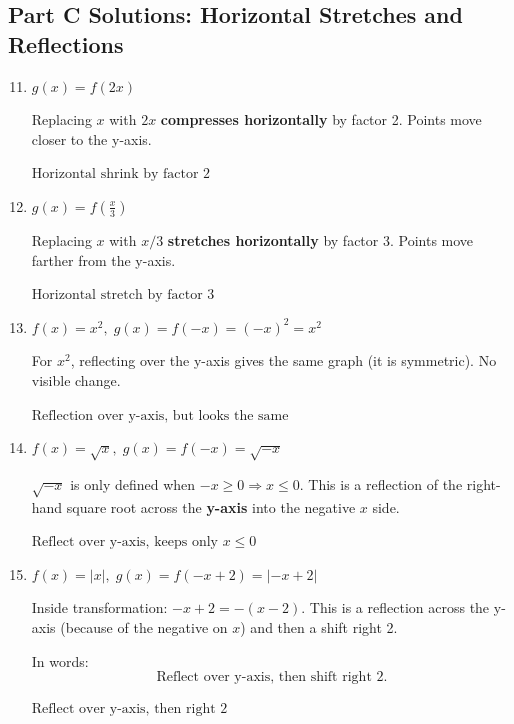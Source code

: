 \documentclass[14pt]{extarticle}
\begin{document}
\subsection*{Part C Solutions: Horizontal Stretches and Reflections}
\begin{enumerate}
  \setcounter{enumi}{10}
  \item \(g(x) = f(2x)\)

  Replacing \(x\) with \(2x\) \textbf{compresses horizontally} by factor 2. Points move closer to the y-axis.

  \(\boxed{\text{Horizontal shrink by factor 2}}\)

  \item \(g(x) = f\left(\frac{x}{3}\right)\)

  Replacing \(x\) with \(x/3\) \textbf{stretches horizontally} by factor 3. Points move farther from the y-axis.

  \(\boxed{\text{Horizontal stretch by factor 3}}\)

  \item \(f(x) = x^2,\; g(x) = f(-x) = (-x)^2 = x^2\)

  For \(x^2\), reflecting over the y-axis gives the same graph (it is symmetric). No visible change.

  \(\boxed{\text{Reflection over y-axis, but looks the same}}\)

  \item \(f(x) = \sqrt{x},\; g(x) = f(-x) = \sqrt{-x}\)

  \(\sqrt{-x}\) is only defined when \(-x \ge 0 \Rightarrow x \le 0.\)  
  This is a reflection of the right-hand square root across the \textbf{y-axis} into the negative \(x\) side.

  \(\boxed{\text{Reflect over y-axis, keeps only } x \le 0}\)

  \item \(f(x) = |x|,\; g(x) = f(-x + 2) = |-x + 2|\)

  Inside transformation: \(-x + 2 = -(x - 2)\).  
  This is a reflection across the y-axis (because of the negative on \(x\)) and then a shift right 2.

  In words:
  \[
  \text{Reflect over y-axis, then shift right 2.}
  \]

  \(\boxed{\text{Reflect over y-axis, then right 2}}\)
\end{enumerate}
\end{document}
